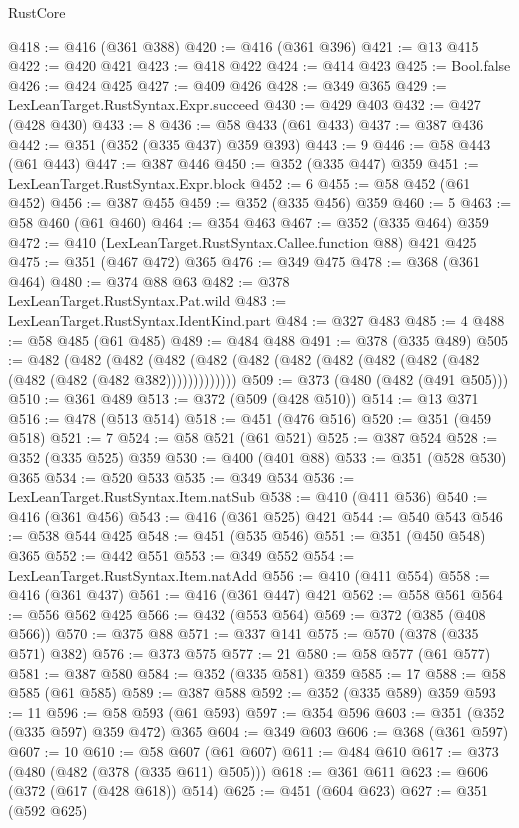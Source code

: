 \begin{lexlean}{RustCore}
\begin{coremodule}
@418 := @416 (@361 @388)
@420 := @416 (@361 @396)
@421 := @13 @415
@422 := @420 @421
@423 := @418 @422
@424 := @414 @423
@425 := Bool.false
@426 := @424 @425
@427 := @409 @426
@428 := @349 @365
@429 := LexLeanTarget.RustSyntax.Expr.succeed
@430 := @429 @403
@432 := @427 (@428 @430)
@433 := 8
@436 := @58 @433 (@61 @433)
@437 := @387 @436
@442 := @351 (@352 (@335 @437) @359 @393)
@443 := 9
@446 := @58 @443 (@61 @443)
@447 := @387 @446
@450 := @352 (@335 @447) @359
@451 := LexLeanTarget.RustSyntax.Expr.block
@452 := 6
@455 := @58 @452 (@61 @452)
@456 := @387 @455
@459 := @352 (@335 @456) @359
@460 := 5
@463 := @58 @460 (@61 @460)
@464 := @354 @463
@467 := @352 (@335 @464) @359
@472 := @410 (LexLeanTarget.RustSyntax.Callee.function @88) @421 @425
@475 := @351 (@467 @472) @365
@476 := @349 @475
@478 := @368 (@361 @464)
@480 := @374 @88 @63
@482 := @378 LexLeanTarget.RustSyntax.Pat.wild
@483 := LexLeanTarget.RustSyntax.IdentKind.part
@484 := @327 @483
@485 := 4
@488 := @58 @485 (@61 @485)
@489 := @484 @488
@491 := @378 (@335 @489)
@505 := @482
    (@482 (@482 (@482 (@482 (@482 (@482 (@482 (@482 (@482 (@482 (@482 (@482 (@482 @382)))))))))))))
@509 := @373 (@480 (@482 (@491 @505)))
@510 := @361 @489
@513 := @372 (@509 (@428 @510))
@514 := @13 @371
@516 := @478 (@513 @514)
@518 := @451 (@476 @516)
@520 := @351 (@459 @518)
@521 := 7
@524 := @58 @521 (@61 @521)
@525 := @387 @524
@528 := @352 (@335 @525) @359
@530 := @400 (@401 @88)
@533 := @351 (@528 @530) @365
@534 := @520 @533
@535 := @349 @534
@536 := LexLeanTarget.RustSyntax.Item.natSub
@538 := @410 (@411 @536)
@540 := @416 (@361 @456)
@543 := @416 (@361 @525) @421
@544 := @540 @543
@546 := @538 @544 @425
@548 := @451 (@535 @546)
@551 := @351 (@450 @548) @365
@552 := @442 @551
@553 := @349 @552
@554 := LexLeanTarget.RustSyntax.Item.natAdd
@556 := @410 (@411 @554)
@558 := @416 (@361 @437)
@561 := @416 (@361 @447) @421
@562 := @558 @561
@564 := @556 @562 @425
@566 := @432 (@553 @564)
@569 := @372 (@385 (@408 @566))
@570 := @375 @88
@571 := @337 @141
@575 := @570 (@378 (@335 @571) @382)
@576 := @373 @575
@577 := 21
@580 := @58 @577 (@61 @577)
@581 := @387 @580
@584 := @352 (@335 @581) @359
@585 := 17
@588 := @58 @585 (@61 @585)
@589 := @387 @588
@592 := @352 (@335 @589) @359
@593 := 11
@596 := @58 @593 (@61 @593)
@597 := @354 @596
@603 := @351 (@352 (@335 @597) @359 @472) @365
@604 := @349 @603
@606 := @368 (@361 @597)
@607 := 10
@610 := @58 @607 (@61 @607)
@611 := @484 @610
@617 := @373 (@480 (@482 (@378 (@335 @611) @505)))
@618 := @361 @611
@623 := @606 (@372 (@617 (@428 @618)) @514)
@625 := @451 (@604 @623)
@627 := @351 (@592 @625)

\end{coremodule}
\end{lexlean}
